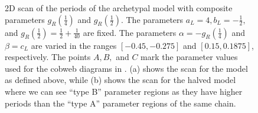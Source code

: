 \begin{figure}
	\centering
	\caption[2D scans of the periods of the archetypal model]{
		2D scan of the periods of the archetypal model with composite parameters $g_R\left(\frac{1}{4}\right)$ and $g_R\left(\frac{1}{2}\right)$.
		The parameters $a_L = 4, b_L = -\frac{1}{2},$ and $g_R\left(\frac{1}{2}\right) = \frac{1}{2} + \frac{1}{40}$ are fixed.
		The parameters $\alpha = -g_R\left(\frac{1}{4}\right)$ and $\beta = c_L$ are varied in the ranges $[-0.45, -0.275]$ and $[0.15, 0.1875]$, respectively.
		The points $A, B,$ and $C$ mark the parameter values used for the cobweb diagrams in .
		(a) shows the scan for the model as defined above, while (b) shows the scan for the halved model where we can see ``type B'' parameter regions as they have higher periods than the ``type A'' parameter regions of the same chain.
	}
	\label{fig:setup.arch.period}
\end{figure}

